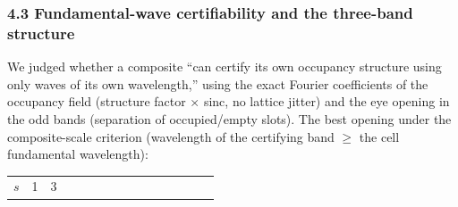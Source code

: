 \documentclass[
]{article}
\newcounter{none} %
\begin{document}
\subsubsection{4.3 Fundamental-wave certifiability and the three-band
structure}\label{fundamental-wave-certifiability-and-the-three-band-structure}

We judged whether a composite ``can certify its own occupancy structure
using only waves of its own wavelength,'' using the exact Fourier
coefficients of the occupancy field (structure factor × sinc, no lattice
jitter) and the eye opening in the odd bands (separation of
occupied/empty slots). The best opening under the composite-scale
criterion (wavelength of the certifying band \(\ge\) the cell fundamental
wavelength):

{\def\LTcaptype{none} %
\begin{longtable}[]{@{}
  >{\raggedright\arraybackslash}p{}
  >{\raggedright\arraybackslash}p{}
  >{\raggedright\arraybackslash}p{}
  >{\raggedright\arraybackslash}p{}
  >{\raggedright\arraybackslash}p{}
  >{\raggedright\arraybackslash}p{}
  >{\raggedright\arraybackslash}p{}
  >{\raggedright\arraybackslash}p{}
  >{\raggedright\arraybackslash}p{}
  >{\raggedright\arraybackslash}p{}
  >{\raggedright\arraybackslash}p{}
  >{\raggedright\arraybackslash}p{}
  >{\raggedright\arraybackslash}p{}
  >{\raggedright\arraybackslash}p{}
  >{\raggedright\arraybackslash}p{}@{}}
\toprule\noalign{}
\begin{minipage}[b]{\linewidth}\raggedright
\(s\)
\end{minipage} & \begin{minipage}[b]{\linewidth}\raggedright
1
\end{minipage} & \begin{minipage}[b]{\linewidth}\raggedright
3
\end{minipage} & \begin{minipage}[b]{\linewidth}\raggedright

\end{minipage}
\end{longtable}}
\end{document}
